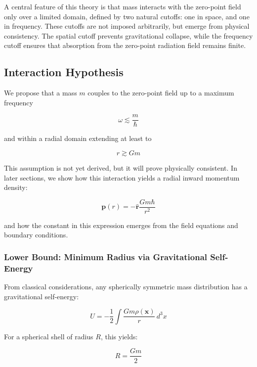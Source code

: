 \documentclass {article}
\renewcommand\vec{\mathbf}
\let\OldHat\hat
\renewcommand{\hat}[1]{\OldHat{\mathbf{#1}}}
\begin{document}
A central feature of this theory is that mass interacts with the zero-point field only over a limited domain, defined by two natural cutoffs: one in space, and one in frequency. These cutoffs are not imposed arbitrarily, but emerge from physical consistency. The spatial cutoff prevents gravitational collapse, while the frequency cutoff ensures that absorption from the zero-point radiation field remains finite.

\subsection*{Interaction Hypothesis}

We propose that a mass \( m \) couples to the zero-point field up to a maximum frequency 

\begin{equation}
\omega \lesssim \frac{m}{\hbar}
\end{equation}


and within a radial domain extending at least to 

\begin{equation}
r \gtrsim Gm
\end{equation}

This assumption is not yet derived, but it will prove physically consistent. In later sections, we show how this interaction yields a radial inward momentum density:


\begin{equation}
\boxed{\vec{p}(r) = -\hat{r} \frac{G m \hbar}{r^2}}
\end{equation}


and how the constant in this expression emerges from the field equations and boundary conditions.

\subsubsection*{Lower Bound: Minimum Radius via Gravitational Self-Energy}

From classical considerations, any spherically symmetric mass distribution has a gravitational self-energy:


\begin{equation}
U = -\frac{1}{2} \int \frac{G m \rho(\vec{x})}{r} \, d^3x
\end{equation}

For a spherical shell of radius \( R \), this yields:


\begin{equation}
R = \frac{G m}{2}
\end{equation}
\end{document}
